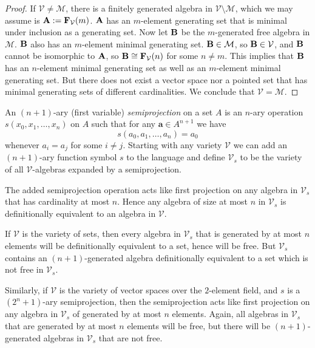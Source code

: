 \begin{proof}
  If ${\mathcal V}\neq {\mathcal M}$,
  there is a finitely generated
  algebra in $\mathcal V\setminus\mathcal M$,
  which we may assume is ${{\mathbf{\uppercase{a}}}}:={{\mathbf{\uppercase{f}}}}_{\mathcal V}(m)$.
  ${{\mathbf{\uppercase{a}}}}$ has an $m$-element generating set
  that is minimal under inclusion as a generating set.
  Now let ${{\mathbf{\uppercase{b}}}}$ be the $m$-generated free algebra in $\mathcal M$.
  ${{\mathbf{\uppercase{b}}}}$ also has an $m$-element minimal generating set.
  ${{\mathbf{\uppercase{b}}}}\in{\mathcal M}$, so ${{\mathbf{\uppercase{b}}}}\in {\mathcal V}$, and
  ${{\mathbf{\uppercase{b}}}}$ cannot be isomorphic to ${{\mathbf{\uppercase{a}}}}$,
  so ${{\mathbf{\uppercase{b}}}} \cong {{\mathbf{\uppercase{f}}}}_{\mathcal V}(n)$
  for some $n\neq m$. This implies that ${{\mathbf{\uppercase{b}}}}$
  has an $n$-element minimal generating set as well as an
  $m$-element minimal generating set.
  But there does not exist a vector space nor a pointed set
  that has minimal generating sets of different cardinalities.
  We conclude that $\mathcal V = \mathcal M$.  
\end{proof}

\begin{exmps}
  An $(n+1)$-ary (first variable) \emph{semiprojection} 
  on a set $A$ is an $n$-ary operation $s(x_0,x_1,\ldots,x_n)$
  on $A$ such that for any ${{\mathbf{{a}}}}\in A^{n+1}$ we have
  \[
s(a_0,a_1,\ldots,a_n) = a_0
\]
whenever $a_i=a_j$ for some $i\neq j$.
Starting with any variety $\mathcal V$ we can add an
$(n+1)$-ary function symbol $s$ to the language and define
${\mathcal V}_s$ to be the variety of all
$\mathcal V$-algebras expanded by a semiprojection.

The added semiprojection operation acts like first projection
on any algebra in ${\mathcal V}_s$ that has cardinality
at most $n$. Hence any algebra of size at most $n$
in ${\mathcal V}_s$ is definitionally equivalent to an algebra
in $\mathcal V$.

If $\mathcal V$ is the variety of sets, then every algebra
in ${\mathcal V}_s$ that is generated by at most $n$ elements
will be definitionally equivalent to a set, hence will
be free. But ${\mathcal V}_s$ contains an $(n+1)$-generated
algebra definitionally equivalent to a set which is not free in
${\mathcal V}_s$.

Similarly, if $\mathcal V$ is the variety of vector spaces over
the $2$-element field, and $s$ is a $(2^n+1)$-ary semiprojection,
then the semiprojection acts like first projection
on any algebra in ${\mathcal V}_s$ of generated by at most $n$
elements. Again, all algebras in ${\mathcal V}_s$
that are generated by at most $n$ elements will be free,
but there will be $(n+1)$-generated algebras in ${\mathcal V}_s$
that are not free.
\end{exmps}

